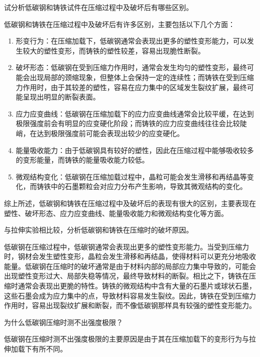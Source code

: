     \item 试分析低碳钢和铸铁试件在压缩过程中及破坏后有哪些区别。\par
    低碳钢和铸铁在压缩过程中及破坏后有许多区别，主要包括以下几个方面：
    \begin{enumerate}
        \item 形变行为：在压缩加载下，低碳钢通常会表现出更多的塑性变形能力，可以发生较大的塑性变形，而铸铁的塑性较差，容易出现脆性断裂。
    
        \item 破坏形态：低碳钢在受到压缩力作用时，通常会发生均匀的塑性变形，最终可能会出现局部的颈缩现象，但整体上会保持一定的连续性；而铸铁在受到压缩力作用时，由于其较差的塑性，容易在应力集中的区域发生裂纹扩展，最终可能呈现出明显的断裂表面。
    
        \item 应力应变曲线：低碳钢在压缩加载下的应力应变曲线通常会比较平缓，在达到极限强度前会有明显的应变硬化阶段；而铸铁的应力应变曲线往往会比较陡峭，在达到极限强度前可能会表现出较少的应变硬化。
    
        \item 能量吸收能力：由于低碳钢具有较好的塑性，因此在压缩过程中能够吸收较多的变形能量，而铸铁的能量吸收能力较低。
    
        \item 微观结构变化：低碳钢在压缩加载过程中，晶粒可能会发生滑移和再结晶等变化，而铸铁中的石墨颗粒会对应力分布产生影响，导致其微观结构的变化。
    \end{enumerate}
    综上所述，低碳钢和铸铁在压缩过程中及破坏后的表现有很大的区别，主要表现在塑性、破坏形态、应力应变曲线、能量吸收能力和微观结构变化等方面。
    \item 与拉伸实验相比较，分析低碳钢和铸铁在压缩时的破坏原因。\par
    低碳钢在压缩过程中，低碳钢通常会表现出更多的塑性变形能力。当受到压缩力时，钢材会发生塑性变形，晶粒会发生滑移和再结晶，使得材料可以更充分地吸收能量。低碳钢在压缩时的破坏通常是由于材料内部的局部应力集中导致的，可能会出现塑性变形过大、局部失稳等情况，最终导致材料的断裂。相比之下，铸铁在压缩时通常会表现出更脆的特性。铸铁的微观结构中含有大量的石墨片或球状石墨，这些石墨会成为应力集中的点，导致材料容易发生裂纹。因此，铸铁在受到压缩力作用时，容易出现裂纹扩展和断裂，而不像低碳钢那样具有较强的塑性变形能力。
    \item 为什么低碳钢压缩时测不出强度极限？\par
    低碳钢在压缩时测不出强度极限的主要原因是由于其在压缩加载下的变形行为与拉伸加载下有所不同。
